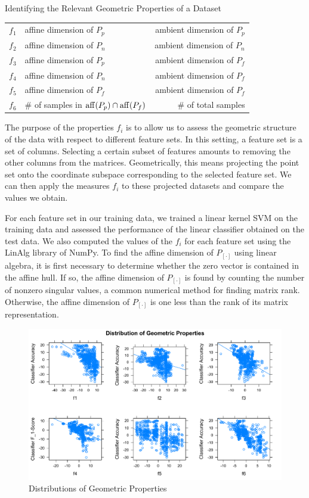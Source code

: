 \documentclass{llncs}
\begin{document}
\begin{section}{Identifying the Relevant Geometric Properties of a Dataset}
\begin{table}[ht]
\begin{tabular}{l l r }
$f_1$&affine dimension of $P_p$& ambient dimension of $P_p$\\
$f_2$&affine dimension of $P_n$& ambient dimension of $P_n$\\
$f_3$&affine dimension of $P_p$& ambient dimension of $P_f$\\
$f_4$&affine dimension of $P_n$& ambient dimension of $P_f$\\
$f_5$&affine dimension of $P_f$& ambient dimension of $P_f$\\
$f_6$&\# of samples in $\operatorname{aff}(P_p)\cap\operatorname{aff}(P_f)$\;\;\;\;\;   &\# of total samples\\
\hline
\end{tabular}
\label{tab:formulas}
\end{table}

The purpose of the properties $f_i$ is to allow us to assess the geometric structure of the data with respect to different feature sets. In this setting, a feature set is a set of columns. Selecting a certain subset of features amounts to removing the other columns from the matrices. Geometrically, this means projecting the point set onto the coordinate subspace corresponding to the selected feature set. We can then apply the measures $f_i$ to these projected datasets and compare the values we obtain.

For each feature set in our training data, we trained a linear kernel SVM on the training data and assessed the performance of the linear classifier obtained on the test data. We also computed the values of the $f_i$ for each feature set using the LinAlg library of NumPy\cite{numpy}. To find the affine dimension of $P_{[\cdot]}$ using linear algebra, it is first necessary to determine whether the zero vector is contained in the affine hull. If so, the affine dimension of $P_{[\cdot]}$ is found by counting the number of nonzero singular values, a common numerical method for finding matrix rank\cite{numR}. Otherwise, the affine dimension of $P_{[\cdot]}$ is one less than the rank of its matrix representation.

\begin{figure}[ht]
\includegraphics[scale = .5]{figures/conf_fig}
\caption{Distributions of Geometric Properties}
\label{fig:AllProps}
\end{figure}


\end{section}
\end{document}
